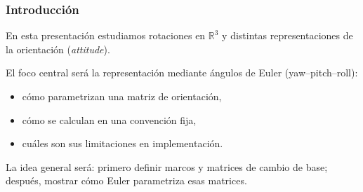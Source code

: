 \documentclass[11pt]{beamer}
\begin{document}
\begin{frame}
    \frametitle{Introducción}

%
%
%
%
%
%


En esta presentación estudiamos rotaciones en \(\mathbb{R}^3\) y distintas representaciones de la orientación (\emph{attitude}).


El foco central será la representación mediante ángulos de Euler (yaw--pitch--roll):
\begin{itemize}
  \item cómo parametrizan una matriz de orientación,
  \item cómo se calculan en una convención fija,
  \item cuáles son sus limitaciones en implementación.
\end{itemize}

La idea general será: primero definir marcos y matrices de cambio de base; después, mostrar cómo Euler parametriza esas matrices.

\end{frame}
\end{document}
